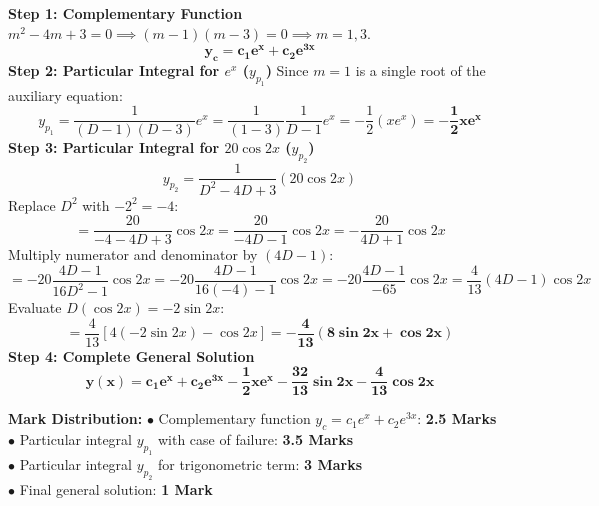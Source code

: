 \begin{solutionbox}
\textbf{Step 1: Complementary Function}
$m^2 - 4m + 3 = 0 \implies (m - 1)(m - 3) = 0 \implies m = 1, 3$.
\[
\mathbf{y_c = c_1 e^x + c_2 e^{3x}}
\]
\textbf{Step 2: Particular Integral for $e^x$ ($y_{p_1}$)}
Since $m = 1$ is a single root of the auxiliary equation:
\[
y_{p_1} = \frac{1}{(D-1)(D-3)} e^x = \frac{1}{(1-3)} \frac{1}{D-1} e^x = -\frac{1}{2} (x e^x) = \mathbf{-\frac{1}{2} x e^x}
\]
\textbf{Step 3: Particular Integral for $20\cos 2x$ ($y_{p_2}$)}
\[
y_{p_2} = \frac{1}{D^2 - 4D + 3} (20 \cos 2x)
\]
Replace $D^2$ with $-2^2 = -4$:
\[
= \frac{20}{-4 - 4D + 3} \cos 2x = \frac{20}{-4D - 1} \cos 2x = -\frac{20}{4D + 1} \cos 2x
\]
Multiply numerator and denominator by $(4D - 1)$:
\[
= -20 \frac{4D - 1}{16D^2 - 1} \cos 2x = -20 \frac{4D - 1}{16(-4) - 1} \cos 2x = -20 \frac{4D - 1}{-65} \cos 2x = \frac{4}{13}(4D - 1)\cos 2x
\]
Evaluate $D(\cos 2x) = -2\sin 2x$:
\[
= \frac{4}{13}[4(-2\sin 2x) - \cos 2x] = \mathbf{-\frac{4}{13}(8\sin 2x + \cos 2x)}
\]
\textbf{Step 4: Complete General Solution}
\[
\mathbf{y(x) = c_1 e^x + c_2 e^{3x} - \frac{1}{2} x e^x - \frac{32}{13}\sin 2x - \frac{4}{13}\cos 2x}
\]

\begin{markingrubric}
\textbf{Mark Distribution:}
$\bullet$ Complementary function $y_c = c_1 e^x + c_2 e^{3x}$: \textbf{2.5 Marks}\\
$\bullet$ Particular integral $y_{p_1}$ with case of failure: \textbf{3.5 Marks}\\
$\bullet$ Particular integral $y_{p_2}$ for trigonometric term: \textbf{3 Marks}\\
$\bullet$ Final general solution: \textbf{1 Mark}
\end{markingrubric}
\end{solutionbox}

